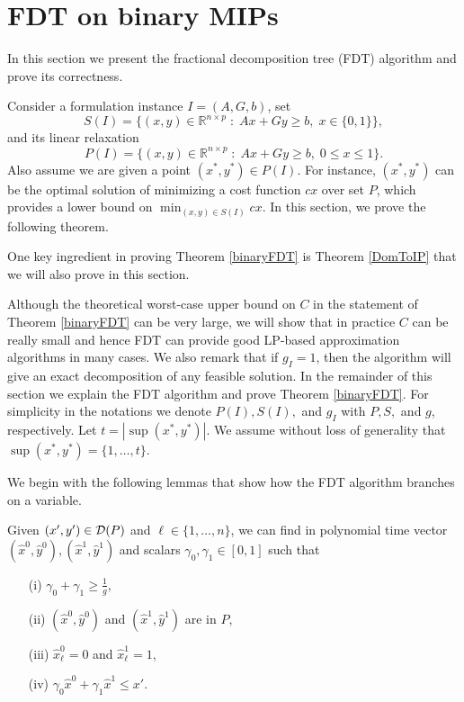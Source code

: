\section{FDT on binary MIPs}
\label{binaryfdt}

In this section we present the fractional decomposition tree (FDT) algorithm and prove its correctness. 

Consider a formulation instance $I=(A,G,b)$, set 
\begin{equation}
S(I)= \{(x,y)\in \mathbb{R}^{n\times p}\;:\; Ax+Gy\geq b,\; x\in \{0,1\}\},  \label{S'}
\end{equation}
and its linear relaxation
\begin{equation}
P(I) = \{(x,y)\in \mathbb{R}^{n\times p}\;:\; Ax+Gy\geq b,\; 0 \leq x\leq 1\}. \label{P'}
\end{equation}
Also assume we are given a point $(x^*,y^*)\in P(I)$. For instance, $(x^*,y^*)$ can be the optimal solution of minimizing a cost function $cx$ over set $P$, which provides a lower bound on $\min_{(x,y)\in S(I)} cx$. In this section, we prove the following theorem.  

\binaryFDT*

One key ingredient in proving Theorem \ref{binaryFDT} is Theorem \ref{DomToIP} that we will also prove in this section.



Although the theoretical worst-case upper bound on $C$ in the statement of Theorem \ref{binaryFDT} can be very large, we will show that in practice $C$ can be really small and hence FDT can provide good LP-based approximation algorithms in many cases. We also remark that if $g_I=1$, then the algorithm will give an exact decomposition of any feasible solution.  In the remainder of this section we explain the FDT algorithm and prove Theorem \ref{binaryFDT}. For simplicity in the notations we denote $P(I),S(I),$ and $g_I$ with $P,S,$ and $g$, respectively. Let $t=|\sup(x^*,y^*)|$. We assume without loss of generality that $\sup(x^*,y^*)= \{1,\ldots,t\}$.

We begin with the following lemmas that show how the FDT algorithm branches on a variable.
\begin{lemma}\label{LPClemma}
	Given $(x',y')\in \operatorname{\mathcal{D}}(P)$ and $\ell\in \{1,\ldots,n\}$, we can find in polynomial time vector $(\hat{x}^0,\hat{y}^0),(\hat{x}^1,\hat{y}^1)$ and scalars $\gamma_0,\gamma_1 \in [0,1]$ such that
	\begin{itemize}
		\item[(i)] $\gamma_0 + \gamma_1  \geq \frac{ 1}{g}$,
		\item[(ii)] $(\hat{x}^0,\hat{y}^0)$ and $(\hat{x}^1,\hat{y}^1)$ are in  $ P$, 
		\item[(iii)] $\hat{x}^0_\ell=0$ and $\hat{x}^1_\ell=1$,
		\item[(iv)] $\gamma_0 \hat{x}^0 + \gamma_1\hat{x}^1 \leq x'$.
	\end{itemize}
\end{lemma}


